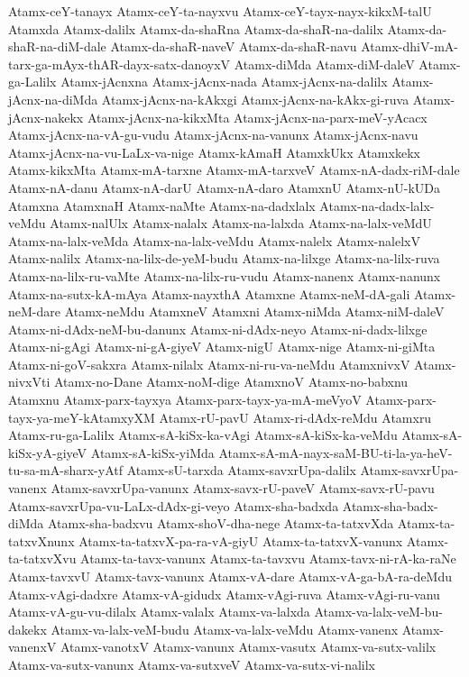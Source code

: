 {Atamx-ceY-tanayx
Atamx-ceY-ta-nayxvu
Atamx-ceY-tayx-nayx-kikxM-talU
Atamxda
Atamx-dalilx
Atamx-da-shaRna
Atamx-da-shaR-na-dalilx
Atamx-da-shaR-na-diM-dale
Atamx-da-shaR-naveV
Atamx-da-shaR-navu
Atamx-dhiV-mA-tarx-ga-mAyx-thAR-dayx-satx-danoyxV
Atamx-diMda
Atamx-diM-daleV
Atamx-ga-Lalilx
Atamx-jAcnxna
Atamx-jAcnx-nada
Atamx-jAcnx-na-dalilx
Atamx-jAcnx-na-diMda
Atamx-jAcnx-na-kAkxgi
Atamx-jAcnx-na-kAkx-gi-ruva
Atamx-jAcnx-nakekx
Atamx-jAcnx-na-kikxMta
Atamx-jAcnx-na-parx-meV-yAcacx
Atamx-jAcnx-na-vA-gu-vudu
Atamx-jAcnx-na-vanunx
Atamx-jAcnx-navu
Atamx-jAcnx-na-vu-LaLx-va-nige
Atamx-kAmaH
AtamxkUkx
Atamxkekx
Atamx-kikxMta
Atamx-mA-tarxne
Atamx-mA-tarxveV
Atamx-nA-dadx-riM-dale
Atamx-nA-danu
Atamx-nA-darU
Atamx-nA-daro
AtamxnU
Atamx-nU-kUDa
Atamxna
AtamxnaH
Atamx-naMte
Atamx-na-dadxlalx
Atamx-na-dadx-lalx-veMdu
Atamx-nalUlx
Atamx-nalalx
Atamx-na-lalxda
Atamx-na-lalx-veMdU
Atamx-na-lalx-veMda
Atamx-na-lalx-veMdu
Atamx-nalelx
Atamx-nalelxV
Atamx-nalilx
Atamx-na-lilx-de-yeM-budu
Atamx-na-lilxge
Atamx-na-lilx-ruva
Atamx-na-lilx-ru-vaMte
Atamx-na-lilx-ru-vudu
Atamx-nanenx
Atamx-nanunx
Atamx-na-sutx-kA-mAya
Atamx-nayxthA
Atamxne
Atamx-neM-dA-gali
Atamx-neM-dare
Atamx-neMdu
AtamxneV
Atamxni
Atamx-niMda
Atamx-niM-daleV
Atamx-ni-dAdx-neM-bu-danunx
Atamx-ni-dAdx-neyo
Atamx-ni-dadx-lilxge
Atamx-ni-gAgi
Atamx-ni-gA-giyeV
Atamx-nigU
Atamx-nige
Atamx-ni-giMta
Atamx-ni-goV-sakxra
Atamx-nilalx
Atamx-ni-ru-va-neMdu
AtamxnivxV
Atamx-nivxVti
Atamx-no-Dane
Atamx-noM-dige
AtamxnoV
Atamx-no-babxnu
Atamxnu
Atamx-parx-tayxya
Atamx-parx-tayx-ya-mA-meVyoV
Atamx-parx-tayx-ya-meY-kAtamxyXM
Atamx-rU-pavU
Atamx-ri-dAdx-reMdu
Atamxru
Atamx-ru-ga-Lalilx
Atamx-sA-kiSx-ka-vAgi
Atamx-sA-kiSx-ka-veMdu
Atamx-sA-kiSx-yA-giyeV
Atamx-sA-kiSx-yiMda
Atamx-sA-mA-nayx-saM-BU-ti-la-ya-heV-tu-sa-mA-sharx-yAtf
Atamx-sU-tarxda
Atamx-savxrUpa-dalilx
Atamx-savxrUpa-vanenx
Atamx-savxrUpa-vanunx
Atamx-savx-rU-paveV
Atamx-savx-rU-pavu
Atamx-savxrUpa-vu-LaLx-dAdx-gi-veyo
Atamx-sha-badxda
Atamx-sha-badx-diMda
Atamx-sha-badxvu
Atamx-shoV-dha-nege
Atamx-ta-tatxvXda
Atamx-ta-tatxvXnunx
Atamx-ta-tatxvX-pa-ra-vA-giyU
Atamx-ta-tatxvX-vanunx
Atamx-ta-tatxvXvu
Atamx-ta-tavx-vanunx
Atamx-ta-tavxvu
Atamx-tavx-ni-rA-ka-raNe
Atamx-tavxvU
Atamx-tavx-vanunx
Atamx-vA-dare
Atamx-vA-ga-bA-ra-deMdu
Atamx-vAgi-dadxre
Atamx-vA-gidudx
Atamx-vAgi-ruva
Atamx-vAgi-ru-vanu
Atamx-vA-gu-vu-dilalx
Atamx-valalx
Atamx-va-lalxda
Atamx-va-lalx-veM-bu-dakekx
Atamx-va-lalx-veM-budu
Atamx-va-lalx-veMdu
Atamx-vanenx
Atamx-vanenxV
Atamx-vanotxV
Atamx-vanunx
Atamx-vasutx
Atamx-va-sutx-valilx
Atamx-va-sutx-vanunx
Atamx-va-sutxveV
Atamx-va-sutx-vi-nalilx
}
